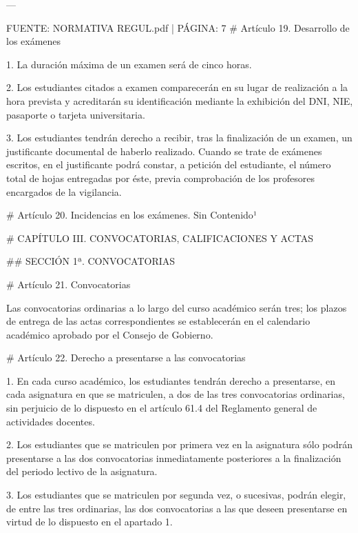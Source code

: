 \documentclass{article}
\begin{document}
\begin{itemize}
\begin{itemize}
\begin{scriptsize}
                  ---

                  FUENTE: NORMATIVA REGUL.pdf | PÁGINA: 7
                  \# Artículo 19. Desarrollo de los exámenes

                  1. La duración máxima de un examen será de cinco horas.

                  2. Los estudiantes citados a examen comparecerán en su lugar de realización a la hora prevista y acreditarán su identificación mediante la exhibición del DNI, NIE, pasaporte o tarjeta universitaria.

                  3. Los estudiantes tendrán derecho a recibir, tras la finalización de un examen, un justificante documental de haberlo realizado. Cuando se trate de exámenes escritos, en el justificante podrá constar, a petición del estudiante, el número total de hojas entregadas por éste, previa comprobación de los profesores encargados de la vigilancia.

                  \# Artículo 20. Incidencias en los exámenes. Sin Contenido¹

                  \# CAPÍTULO III. CONVOCATORIAS, CALIFICACIONES Y ACTAS

                  \#\# SECCIÓN 1ª. CONVOCATORIAS

                  \# Artículo 21. Convocatorias

                  Las convocatorias ordinarias a lo largo del curso académico serán tres; los plazos de entrega de las actas correspondientes se establecerán en el calendario académico aprobado por el Consejo de Gobierno.

                  \# Artículo 22. Derecho a presentarse a las convocatorias

                  1. En cada curso académico, los estudiantes tendrán derecho a presentarse, en cada asignatura en que se matriculen, a dos de las tres convocatorias ordinarias, sin perjuicio de lo dispuesto en el artículo 61.4 del Reglamento general de actividades docentes.

                  2. Los estudiantes que se matriculen por primera vez en la asignatura sólo podrán presentarse a las dos convocatorias inmediatamente posteriores a la finalización del periodo lectivo de la asignatura.

                  3. Los estudiantes que se matriculen por segunda vez, o sucesivas, podrán elegir, de entre las tres ordinarias, las dos convocatorias a las que deseen presentarse en virtud de lo dispuesto en el apartado 1.


\end{scriptsize}
\end{itemize}
\end{itemize}
\end{document}
